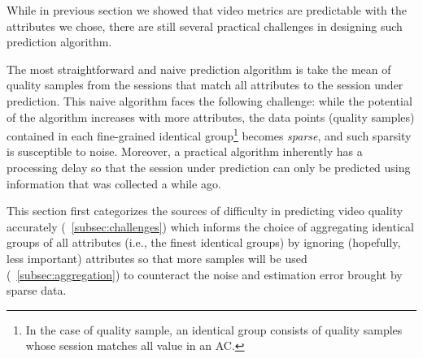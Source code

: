 \label{sec:challenges}

While in previous section we showed that video metrics are predictable with the attributes we chose, there are still several practical challenges in designing such prediction algorithm. 

The most straightforward and naive prediction algorithm is take the mean of quality samples from the sessions that match all attributes to the session under prediction.
This naive algorithm faces the following challenge: while the potential of the algorithm increases with more attributes, the data points (quality samples) contained in each fine-grained identical group\footnote{In the case of quality sample, an identical group consists of quality samples whose session matches all value in an AC.} becomes {\it sparse}, and such sparsity is susceptible to noise. Moreover, a practical algorithm inherently has a processing delay so that the session under prediction can only be predicted using information that was collected a while ago.


This section first categorizes the sources of difficulty in predicting video quality accurately (\Section~\ref{subsec:challenges}) which informs the choice of aggregating identical groups of all attributes (i.e., the finest identical groups) by ignoring (hopefully, less important) attributes so that more samples will be used (\Section~\ref{subsec:aggregation}) to counteract the noise and estimation error brought by sparse data.

\label{subsec:challenges}

